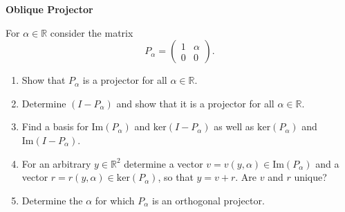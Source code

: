 \textbf{Oblique Projector}

For $\alpha\in\mathbb{R}$ consider the matrix $$P_\alpha =\begin{pmatrix}
1 & \alpha\\
0 & 0
\end{pmatrix}.$$

\begin{enumerate}
	\item Show that $P_\alpha$ is a projector for all $\alpha \in \mathbb{R}$.
	\item Determine $(I - P_\alpha)$ and show that it is a projector for all $\alpha \in \mathbb{R}$.
	\item Find a basis for $\text{Im}(P_\alpha)$ and $\text{ker}(I-P_\alpha)$ as well as $\text{ker}(P_\alpha)$ and $\text{Im}(I-P_\alpha)$.
	\item For an arbitrary $y \in \mathbb{R}^2$ determine a vector $v=v(y,\alpha) \in \text{Im}(P_\alpha)$ and a vector $r = r(y,\alpha) \in \text{ker}(P_\alpha)$, so that $y = v + r$. Are $v$ and $r$ unique?
	\item Determine the $\alpha$ for which $P_\alpha$ is an orthogonal projector.
\end{enumerate}